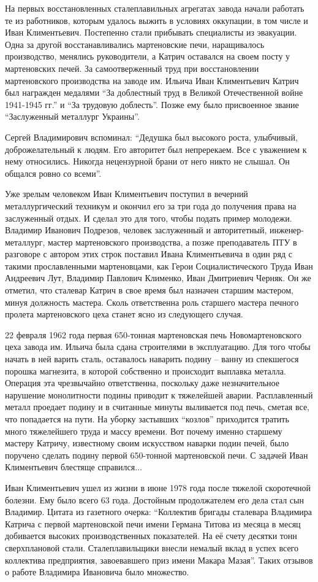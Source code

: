 На первых восстановленных сталеплавильных агрегатах завода начали работать те
из работников, которым удалось выжить в условиях оккупации, в том числе и Иван
Климентьевич. Постепенно стали прибывать специалисты из эвакуации. Одна за
другой восстанавливались мартеновские печи, наращивалось производство, менялись
руководители, а Катрич оставался на своем посту у мартеновских печей. За
самоотверженный труд при восстановлении мартеновского производства на заводе
им. Ильича Иван Климентьевич Катрич был награжден медалями \enquote{За доблестный труд
в Великой Отечественной войне 1941-1945 гг.} и \enquote{За трудовую доблесть}. Позже
ему было присвоенное звание \enquote{Заслуженный металлург Украины}.

Сергей Владимирович вспоминал: \enquote{Дедушка был высокого роста, улыбчивый,
доброжелательный к людям. Его авторитет был непререкаем. Все с уважением к нему
относились. Никогда нецензурной брани от него никто не слышал. Он общался ровно
со всеми}.

Уже зрелым человеком Иван Климентьевич поступил в вечерний металлургический
техникум и окончил его за три года до получения права на заслуженный отдых. И
сделал это для того, чтобы подать пример молодежи. Владимир Иванович Подрезов,
человек заслуженный и авторитетный, инженер-металлург, мастер мартеновского
производства, а позже преподаватель ПТУ в разговоре с автором этих строк
поставил Ивана Климентьевича в один ряд с такими прославленными мартеновцами,
как Герои Социалистического Труда Иван Андреевич Лут, Владимир Павлович
Клименко, Иван Дмитриевич Черняк. Он же отметил, что сталевар Катрич в свое
время был назначен старшим мастером, минуя должность мастера. Сколь
ответственна роль старшего мастера печного пролета мартеновского цеха станет
ясно из следующего случая.

22 февраля 1962 года первая 650-тонная мартеновская печь Новомартеновского цеха
завода им. Ильича была сдана строителями в эксплуатацию. Для того чтобы начать
в ней варить сталь, оставалось наварить подину – ванну из спекшегося порошка
магнезита, в которой собственно и происходит выплавка металла. Операция эта
чрезвычайно ответственна, поскольку даже незначительное  нарушение монолитности
подины приводит к тяжелейшей аварии. Расплавленный металл проедает подину и в
считанные минуты выливается под печь, сметая все, что попадается на пути. На
уборку застывших \enquote{козлов} приходится тратить много тяжелейшего труда и массу
времени. Вот почему именно старшему мастеру Катричу, известному своим
искусством наварки подин печей, было поручено сделать подину первой 650-тонной
мартеновской печи. С задачей Иван Климентьевич блестяще справился...

Иван Климентьевич ушел из жизни в июне 1978 года после тяжелой скоротечной
болезни. Ему было всего 63 года. Достойным продолжателем его дела  стал сын
Владимир. Цитата из газетного очерка: \enquote{Коллектив бригады сталевара Владимира
Катрича с первой мартеновской печи имени Германа Титова из месяца в месяц
добивается высоких произ­водственных показателей. На её счету десятки тонн
сверхплановой стали. Сталеплавильщики внесли немалый вклад в успех всего
коллектива предприятия, завоевавшего приз имени Макара Мазая}. Таких отзывов о
работе Владимира Ивановича было множество.
